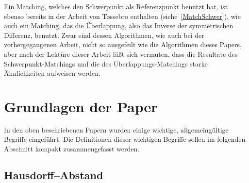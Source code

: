 Ein Matching, welches den Schwerpunkt als Referenzpunkt benutzt hat, ist ebenso bereits in der Arbeit von T\o{}ssebro enthalten (siehe~\vref{MatchSchwer}), wie auch ein Matching, das die Überlappung, also das Inverse der symmetrischen Differenz, benutzt. Zwar sind dessen Algorithmen, wie auch bei der vorhergegangenen Arbeit, nicht so ausgefeilt wie die Algorithmen dieses Papers, aber nach der Lektüre dieser Arbeit läßt sich vermuten, dass die Resultate des Schwerpunkt-Matchings und die des Überlappungs-Matchings starke Ähnlichkeiten aufweisen werden. 

\section{Grundlagen der Paper}
In den oben beschriebenen Papern wurden einige wichtige, allgemeingültige Begriffe eingeführt. Die Definitionen dieser wichtigen Begriffe sollen im folgenden Abschnitt kompakt zusammengefasst werden.

\subsection{Hausdorff--Abstand}\label{Hausdorff} 

